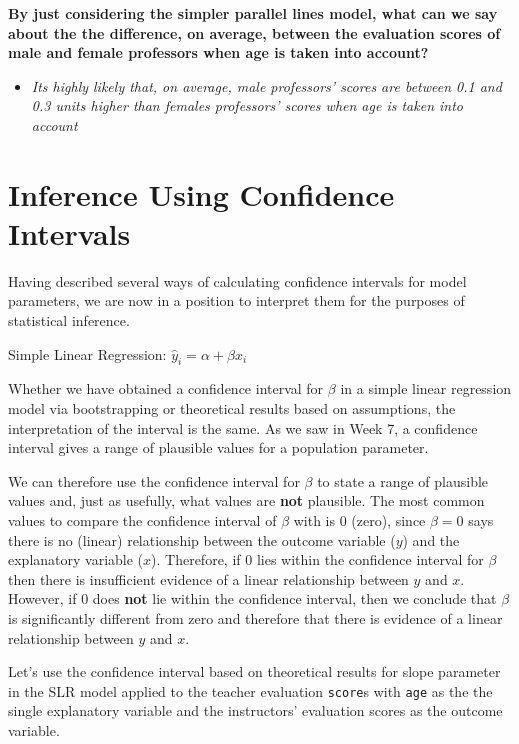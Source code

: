 \documentclass[]{article}
\providecommand{\tightlist}{%
  \setlength{\itemsep}{0pt}\setlength{\parskip}{0pt}}
\begin{document}
\textbf{By just considering the simpler parallel lines model, what can
we say about the the difference, on average, between the evaluation
scores of male and female professors when age is taken into account?}

\begin{itemize}
\tightlist
\item
  \emph{Its highly likely that, on average, male professors' scores are
  between 0.1 and 0.3 units higher than females professors' scores when
  age is taken into account}
\end{itemize}

\newpage

\section{Inference Using Confidence
Intervals}\label{inference-using-confidence-intervals}

Having described several ways of calculating confidence intervals for
model parameters, we are now in a position to interpret them for the
purposes of statistical inference.

Simple Linear Regression: \(\hat{y}_i = \alpha + \beta x_i\)

Whether we have obtained a confidence interval for \(\beta\) in a simple
linear regression model via bootstrapping or theoretical results based
on assumptions, the interpretation of the interval is the same. As we
saw in Week 7, a confidence interval gives a range of plausible values
for a population parameter.

We can therefore use the confidence interval for \(\beta\) to state a
range of plausible values and, just as usefully, what values are
\textbf{not} plausible. The most common values to compare the confidence
interval of \(\beta\) with is 0 (zero), since \(\beta = 0\) says there
is no (linear) relationship between the outcome variable (\(y\)) and the
explanatory variable (\(x\)). Therefore, if 0 lies within the confidence
interval for \(\beta\) then there is insufficient evidence of a linear
relationship between \(y\) and \(x\). However, if 0 does \textbf{not}
lie within the confidence interval, then we conclude that \(\beta\) is
significantly different from zero and therefore that there is evidence
of a linear relationship between \(y\) and \(x\).

Let's use the confidence interval based on theoretical results for slope
parameter in the SLR model applied to the teacher evaluation
\texttt{score}s with \texttt{age} as the the single explanatory variable
and the instructors' evaluation scores as the outcome variable.
\end{document}
